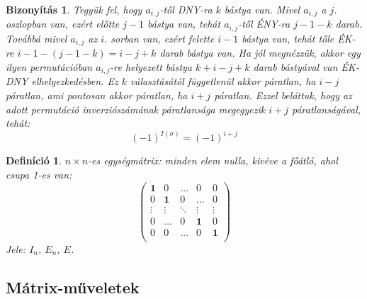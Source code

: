 \documentclass[a4paper,12pt,twoside]{book}
\newtheorem{defi}{Definíció}[chapter]
\newtheorem{biz}{Bizonyítás}[chapter]
\theoremstyle{break}
\begin{document}
\begin{biz}
Tegyük fel, hogy $a_{i,j}$-től DNY-ra $k$ bástya van. Mivel $a_{i,j}$ a $j$. oszlopban van, ezért előtte $j-1$ bástya van, tehát $a_{i,j}$-től ÉNY-ra $j-1-k$ darab. Továbbá mivel $a_{i,j}$ az $i$. sorban van, ezért felette $i-1$ bástya van, tehát tőle ÉK-re $i-1-(j-1-k) = i-j+k$ darab bástya van. Ha jól megnézzük, akkor egy ilyen permutációban $a_{i,j}$-re helyezett bástya $k+i-j+k$ darab bástyával van ÉK-DNY elhelyezkedésben. Ez $k$ választásától függetlenül akkor páratlan, ha $i-j$ páratlan, ami pontosan akkor páratlan, ha $i+j$ páratlan. Ezzel beláttuk, hogy az adott permutáció inverziószámának páratlansága megegyezik $i+j$ páratlanságával, tehát:
\[(-1)^{I(\sigma)} = (-1)^{i+j}\]

\end{biz}

\begin{defi}
 \emph{$n\times n$-es egységmátrix}: minden elem nulla, kivéve a főátló, ahol csupa 1-es van:
\[\begin{pmatrix}
   \mathbf{1} & 0 & \ldots & 0 & 0 \\
   0 & \mathbf{1} & 0 & \ldots & 0 \\
   \vdots & \vdots & \ddots & \vdots & \vdots \\
   0 & \ldots & 0 & \mathbf{1} & 0 \\
   0 & 0 & \ldots & 0 & \mathbf{1} \\
  \end{pmatrix}\]
Jele: $I_n$, $E_n$, $E$.
\end{defi}

\subsection{Mátrix-műveletek}
\end{document}
